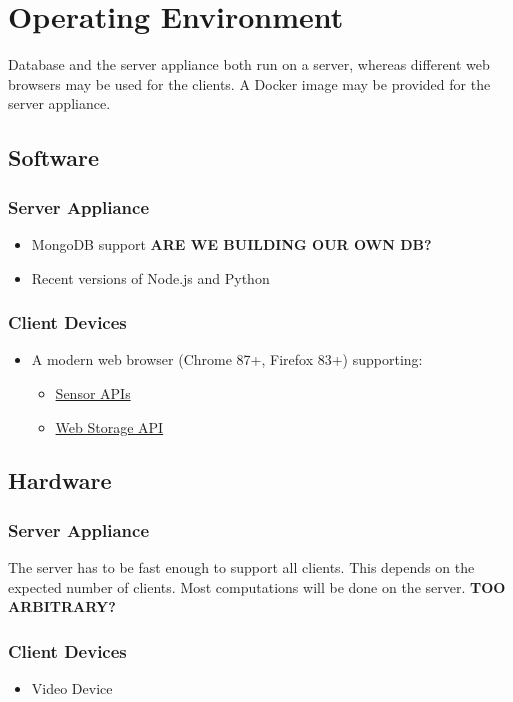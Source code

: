 \section{Operating Environment}
Database and the server appliance both run on a server, whereas different web browsers may be used for the clients. A Docker image may be provided for the server appliance.

\subsection{Software}
\subsubsection{Server Appliance}
\begin{itemize}
    \item MongoDB support \textbf{ARE WE BUILDING OUR OWN DB?}
    \item Recent versions of Node.js and Python %
\end{itemize}
\subsubsection{Client Devices}
\begin{itemize}
    \item A modern web browser (Chrome 87+, Firefox 83+) supporting:
    \begin{itemize}
        \item \href{https://developer.mozilla.org/en-US/docs/Web/API/Sensor_APIs}{Sensor APIs}
        \item \href{https://developer.mozilla.org/en-US/docs/Web/API/Web_Storage_API}{Web Storage API}
    \end{itemize}
\end{itemize}

\subsection{Hardware} %
\subsubsection{Server Appliance}
    The server has to be fast enough to support all clients. This depends on the expected number of clients. Most computations will be done on the server. \textbf{TOO ARBITRARY?}
\subsubsection{Client Devices}
\begin{itemize}
    \item Video Device
\end{itemize}

